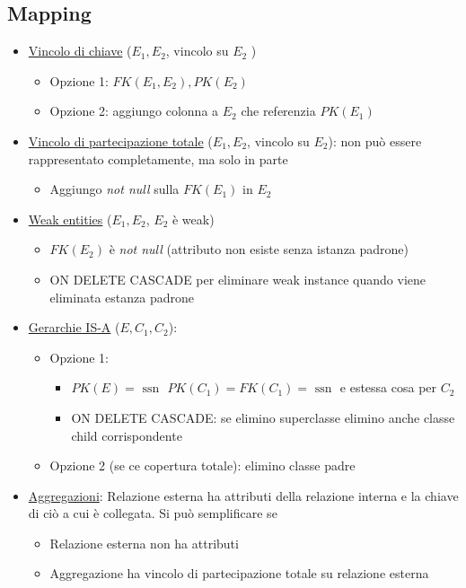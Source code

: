 \subsection{Mapping}
\begin{itemize}
  \item \underline{Vincolo di chiave} ($ E_1, E_2 $, vincolo su $ E_2 $ )
    \begin{itemize}
      \item Opzione 1: $ FK\left(E_1, E_2\right), PK\left(E_2\right) $
      \item Opzione 2: aggiungo colonna a $ E_2 $ che referenzia $ PK\left(E_1\right) $
    \end{itemize}
  \item \underline{Vincolo di partecipazione totale} ($ E_1, E_2 $, vincolo su $ E_2 $): non può essere rappresentato completamente, ma solo in parte 
    \begin{itemize}
      \item Aggiungo \textit{not null} sulla $ FK\left(E_1\right) $ in $ E_2 $
    \end{itemize}
  \item \underline{Weak entities} ($ E_1, E_2 $, $ E_2 $ è weak)
    \begin{itemize}
      \item $ FK\left(E_2\right) $ è \textit{not null} (attributo non esiste senza istanza padrone)
      \item ON DELETE CASCADE per eliminare weak instance quando viene eliminata estanza padrone
    \end{itemize}
  \item \underline{Gerarchie IS-A} ($ E, C_1, C_2 $): 
      \begin{itemize}
        \item Opzione 1: 
          \begin{itemize}
            \item $ PK(E) = \text{ ssn }$  $ PK\left(C_1\right) = FK\left(C_1\right) = \text{ ssn } $ e estessa cosa per $ C_2 $
            \item ON DELETE CASCADE: se elimino superclasse elimino anche classe child corrispondente
          \end{itemize}
        \item Opzione 2 (se ce copertura totale): elimino classe padre
      \end{itemize}
    \item \underline{Aggregazioni}: Relazione esterna ha attributi della relazione interna e la chiave di ciò a cui è collegata. Si può semplificare se 
      \begin{itemize}
        \item Relazione esterna non ha attributi
        \item Aggregazione ha vincolo di partecipazione totale su relazione esterna
      \end{itemize}
\end{itemize}
